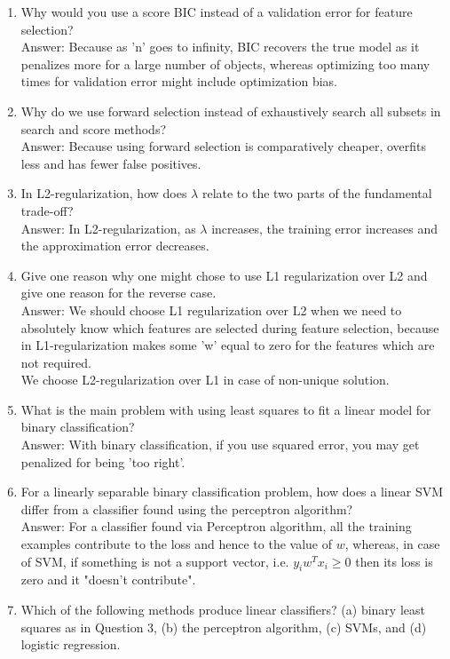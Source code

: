 \documentclass{article}
\def\blu#1{{\color{blu}#1}}
\def\enum#1{\begin{enumerate}#1\end{enumerate}}
\begin{document}
\enum{
\item Why would you use a score BIC instead of a validation error for feature selection?\\
\blu{Answer: Because as 'n' goes to infinity, BIC recovers the true model as it penalizes more for a large number of objects, whereas optimizing too many times for validation error might include optimization bias.}
\item Why do we use forward selection instead of exhaustively search all subsets in search and score methods?\\
\blu{Answer: Because using forward selection is comparatively cheaper, overfits less and has fewer false positives. }
\item In L2-regularization, how does $\lambda$ relate to the two parts of the fundamental trade-off? \\
\blu{Answer: In L2-regularization, as $\lambda$ increases, the training error increases and the approximation error decreases. } 
\item Give one reason why one might chose to use L1 regularization over L2 and give one reason for the reverse case.\\
\blu{Answer: We should choose L1 regularization over L2 when we need to absolutely know which features are selected during feature selection, because in L1-regularization makes some 'w' equal to zero for the features which are not required. \\ 
We choose L2-regularization over L1 in case of non-unique solution.}
\item What is the main problem with using least squares to fit a linear model for binary classification? \\
\blu{Answer: With binary classification, if you use squared error, you may get penalized for being 'too right'.}
\item For a linearly separable binary classification problem, how does a linear SVM differ from a classifier found using the perceptron algorithm? \\
\blu{Answer: For a classifier found via Perceptron algorithm, all the training examples contribute to the loss and hence to the value of $w$, whereas, in case of SVM, if something is not a support vector, i.e. $ y_iw^Tx_i \geq 0$ then its loss is zero and it "doesn't contribute". }
\item Which of the following methods produce linear classifiers? (a) binary least squares as in Question 3, (b) the perceptron algorithm, (c) SVMs, and (d) logistic regression. \\
}
\end{document}
